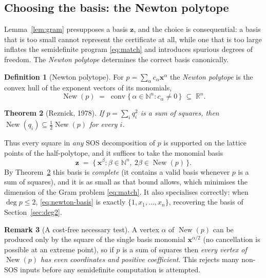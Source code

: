 \documentclass[11pt]{article}
\theoremstyle{definition}
\newtheorem{definition}{Definition}[section]
\newtheorem{remark}[definition]{Remark}
\theoremstyle{plain}
\newtheorem{theorem}[definition]{Theorem}
\newcommand{\R}{\mathbb{R}}
\newcommand{\N}{\mathbb{N}}
\newcommand{\x}{\mathbf{x}}
\newcommand{\z}{\mathbf{z}}
\DeclareMathOperator{\New}{New}
\DeclareMathOperator{\conv}{conv}
\begin{document}
\subsection{Choosing the basis: the Newton polytope}
\label{sec:newton}

Lemma~\ref{lem:gram} presupposes a basis $\z$, and the choice is consequential:
a basis that is too small cannot represent the certificate at all, while one that
is too large inflates the semidefinite program \eqref{eq:match} and introduces
spurious degrees of freedom. The \emph{Newton polytope} determines the correct
basis canonically.

\begin{definition}[Newton polytope]
For $p = \sum_{\alpha} c_\alpha \x^{\alpha}$ the \emph{Newton polytope} is the
convex hull of the exponent vectors of its monomials,
\[
  \New(p) \;=\; \conv\{\, \alpha \in \N^n : c_\alpha \neq 0 \,\} \;\subseteq\; \R^n .
\]
\end{definition}

\begin{theorem}[Reznick, 1978]\label{thm:reznick}
If $p = \sum_i q_i^2$ is a sum of squares, then
$\New(q_i) \subseteq \tfrac12 \New(p)$ for every $i$.
\end{theorem}

Thus every square in \emph{any} SOS decomposition of $p$ is supported on the
lattice points of the half-polytope, and it suffices to take the monomial basis
\begin{equation}\label{eq:newton-basis}
  \z \;=\; \bigl\{\, \x^{\beta} : \beta \in \N^n,\ 2\beta \in \New(p) \,\bigr\}.
\end{equation}
By Theorem~\ref{thm:reznick} this basis is \emph{complete} (it contains a valid
basis whenever $p$ is a sum of squares), and it is as small as that bound allows,
which minimises the dimension of the Gram problem \eqref{eq:match}. It also
specialises correctly: when $\deg p \le 2$, \eqref{eq:newton-basis} is exactly
$\{1, x_1, \dots, x_n\}$, recovering the basis of Section~\ref{sec:deg2}.

\begin{remark}[A cost-free necessary test]
A vertex $\alpha$ of $\New(p)$ can be produced only by the square of the single
basis monomial $\x^{\alpha/2}$ (no cancellation is possible at an extreme
point), so if $p$ is a sum of squares then \emph{every vertex of $\New(p)$ has
even coordinates and positive coefficient}. This rejects many non-SOS inputs
before any semidefinite computation is attempted.
\end{remark}
\end{document}
